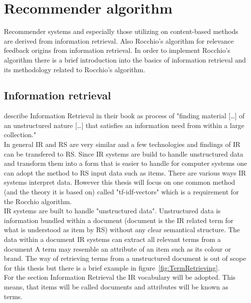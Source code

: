 
\section{Recommender algorithm}
Recommender systems and especially those utilizing on content-based methods are derived from information retrieval.\citep[p.~92-99]{lops:2011}
Also Rocchio's algorithm for relevance feedback origins from information retrieval.\citep[p.~178]{manning:2009}
In order to implement Rocchio's algorithm there is a brief introduction into the basics of information retrieval and its methodology related to Rocchio's algorithm.

\subsection{Information retrieval}
\iffalse
Was ist Information retrieval
in depth implementation is out of scope
Hinleitung zu Vektoren
\fi
\citeauthor{manning:2009} describe Information Retrieval in their book as process of "finding material [\dots] of an unstructured nature [\dots] that satisfies an information need from within a large collection."\citep[p.~1]{manning:2009}\\
In general IR and RS are very similar and a few technologies and findings of IR can be transfered to RS.
Since IR systems are build to handle unstructured data and transform them into a form that is easier to handle for computer systems one can adopt the method to RS input data such as items.\citep[p.~21-23]{ricci:2011}
There are various ways IR systems interpret data.
However this thesis will focus on one common method (and the theory it is based on) called "tf-idf-vectors" which is a requirement for the Rocchio algorithm.\citep[p.~93]{lops:2011}\\
IR systems are built to handle "unstructured data".
Unstructured data is information bundled within a document (document is the IR related term for what is understood as item by RS) without any clear semantical structure.\citep[p.~1-3]{manning:2009}
The data within a document
IR systems can extract all relevant terms from a document
A term may resemble an attribute of an item such as its colour or brand.
The way of retrieving terms from a unstructured document is out of scope for this thesis but there is a brief example in figure~\ref{fig:TermRetrieving}.\\
For the section Information Retrieval the IR vocabulary will be adopted.
This means, that items will be called documents and attributes will be known as terms.

